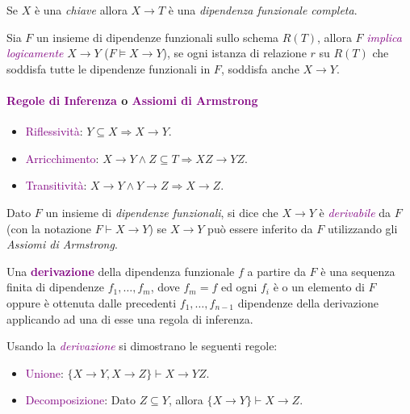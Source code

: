 Se $X$ è una \emph{chiave} allora $X \rightarrow T$ è una \emph{dipendenza funzionale completa}.

\begin{definition}
    Sia $F$ un insieme di dipendenze funzionali sullo schema $R(T)$,
    allora $F$ \emph{\textcolor{purple}{implica logicamente}} $X \rightarrow Y$ ($F \models X \rightarrow Y$),
    se ogni istanza di relazione $r$ su $R(T)$ che soddisfa tutte le dipendenze funzionali
    in $F$, soddisfa anche $X \rightarrow Y$.
\end{definition}

\paragraph{\textcolor{purple}{Regole di Inferenza} o \textcolor{purple}{Assiomi di Armstrong}}
\begin{itemize}
    \item \textcolor{purple}{Riflessività}: $Y \subseteq X \Rightarrow X \rightarrow Y$.
    \item \textcolor{purple}{Arricchimento}: $X \rightarrow Y \land Z \subseteq T \Rightarrow XZ \rightarrow YZ$.
    \item \textcolor{purple}{Transitività}: $X \rightarrow Y \land Y \rightarrow Z \Rightarrow X \rightarrow Z$.
\end{itemize}

\begin{definition}[Derivazione]
    Dato $F$ un insieme di \emph{dipendenze funzionali}, si dice
    che $X \rightarrow Y$ è \emph{\textcolor{purple}{derivabile}} da
    $F$ (con la notazione $F \vdash X \rightarrow Y$) se $X \rightarrow Y$ può
    essere inferito da $F$ utilizzando gli \emph{Assiomi di Armstrong}.

    Una \textbf{\textcolor{purple}{derivazione}} della dipendenza funzionale $f$ a partire
    da $F$ è una sequenza finita di dipendenze $f_1, \dots, f_m$, dove $f_m = f$ ed
    ogni $f_i$ è o un elemento di $F$ oppure è ottenuta dalle precedenti
    $f_1, \dots, f_{n-1}$ dipendenze della derivazione applicando ad una di esse una regola di inferenza.
\end{definition}

Usando la \emph{\textcolor{purple}{derivazione}} si dimostrano le seguenti regole:
\begin{itemize}
    \item \textcolor{purple}{Unione}: $\{X \rightarrow Y, X \rightarrow Z\} \vdash X \rightarrow YZ$.
    \item \textcolor{purple}{Decomposizione}: Dato $Z \subseteq Y$, allora $\{X \rightarrow Y\} \vdash X \rightarrow Z$.
\end{itemize}


